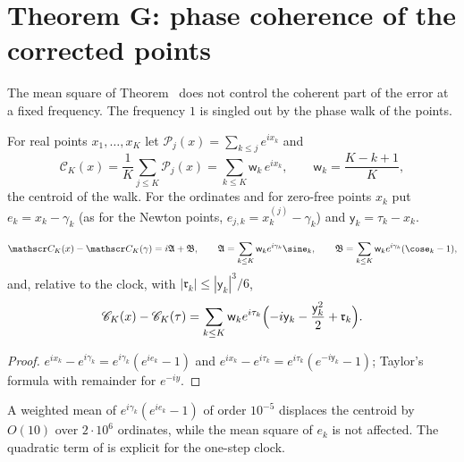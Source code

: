 \section{Theorem G: phase coherence of the corrected points}
\label{sec:walk}

The mean square of Theorem~ does not control the coherent part of the error at a fixed frequency. The frequency $1$ is singled out by the phase walk of the points.

\begin{definition}\label{def:walk}
For real points $x_1,\dots,x_K$ let $\mathscr P_j(x)=\sum_{k\le j}e^{ix_k}$ and
\begin{equation}
\mathscr C_K(x)=\frac1K\sum_{j\le K}\mathscr P_j(x)=\sum_{k\le K}\mathsf w_k\,e^{ix_k},\qquad \mathsf w_k=\frac{K-k+1}K,
\label{eq:walk_def}
\end{equation}
the centroid of the walk. For the ordinates and for zero-free points $x_k$ put $e_k=x_k-\gamma_k$ (as for the Newton points, $e_{j,k}=x^{(j)}_k-\gamma_k$) and $\mathsf y_k=\tau_k-x_k$.
\end{definition}

\begin{proposition}\label{prop:angular_radial}
\begin{equation}
\mathscr C_K(x)-\mathscr C_K(\gamma)=i\mathfrak A+\mathfrak B,\qquad\mathfrak A=\sum_{k\le K}\mathsf w_ke^{i\gamma_k}\sine_k,\qquad\mathfrak B=\sum_{k\le K}\mathsf w_ke^{i\gamma_k}(\cose_k-1),
\label{eq:angular_radial}
\end{equation}
and, relative to the clock, with $|\mathfrak r_k|\le|\mathsf y_k|^3/6$,
\begin{equation}
\mathscr C_K(x)-\mathscr C_K(\tau)=\sum_{k\le K}\mathsf w_ke^{i\tau_k}\Bigl(-i\mathsf y_k-\frac{\mathsf y_k^2}2+\mathfrak r_k\Bigr).
\label{eq:walk_clock_expansion}
\end{equation}
\end{proposition}

\begin{proof}
$e^{ix_k}-e^{i\gamma_k}=e^{i\gamma_k}(e^{ie_k}-1)$ and $e^{ix_k}-e^{i\tau_k}=e^{i\tau_k}(e^{-i\mathsf y_k}-1)$; Taylor's formula with remainder for $e^{-iy}$.
\end{proof}

A weighted mean of $e^{i\gamma_k}(e^{ie_k}-1)$ of order $10^{-5}$ displaces the centroid by $O(10)$ over $2\cdot10^6$ ordinates, while the mean square of $e_k$ is not affected. The quadratic term of  is explicit for the one-step clock.


